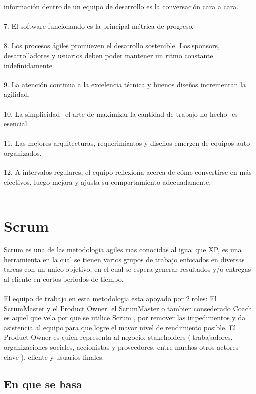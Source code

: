 información       dentro   de   un   equipo    de   desarrollo    es   la 
conversación cara a cara.\\
\\
7.  El   software      funcionando      es   la   principal    métrica    de 
progreso.\\
\\
8.  Los procesos ágiles promueven el desarrollo sostenible. 
Los     sponsors,    desarrolladores      y  usuarios    deben    poder 
mantener un ritmo constante indefinidamente. \\
\\
9.  La   atención   continua   a   la   excelencia   técnica   y   buenos 
diseños incrementan la agilidad.\\
\\
10.  La   simplicidad    –el    arte  de   maximizar      la  cantidad    de 
trabajo no hecho- es esencial.\\
\\
11.  Las    mejores     arquitecturas,     requerimientos       y   diseños 
emergen de equipos auto-organizados.\\
\\
12.  A   intervalos   regulares,   el   equipo   reflexiona   acerca   de 
cómo convertirse en más efectivos, luego mejora y ajusta 
su comportamiento adecuadamente.\\
\\
\section{Scrum}
Scrum es una de las metodologia agiles mas conocidas al igual que XP, es una herramienta en la cual se tienen varios grupos de trabajo enfocados en diversas tareas con un unico objetivo, en el cual se espera generar resultados y/o entregas al cliente en cortos periodos de tiempo.
\\
\\
El equipo de trabajo en esta metodologia esta apoyado por 2 roles:  El ScrumMaster y el Product Owner. el ScrumMaster o tambien consederado Coach es aquel que vela por que se utilice Scrum , por remover las impedimentos y da asistencia al equipo para que logre el mayor nivel de rendimiento  posible.  El   Product   Owner   es 
quien     representa      al  negocio,  stakeholders ( trabajadores, organizaciones sociales, accionistas y proveedores, entre muchos otros actores clave ),         cliente    y  usuarios 
finales. 
\subsection{En que se basa}

